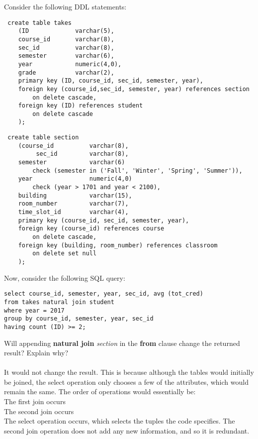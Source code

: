 \documentclass[a4 paper]{article}
\begin{document}
Consider the following DDL statements:
\begin{verbatim}
 create table takes
    (ID             varchar(5),
    course_id       varchar(8),
    sec_id          varchar(8),
    semester        varchar(6),
    year            numeric(4,0),
    grade           varchar(2),
    primary key (ID, course_id, sec_id, semester, year),
    foreign key (course_id,sec_id, semester, year) references section
        on delete cascade,
    foreign key (ID) references student
        on delete cascade
    );
\end{verbatim}
\begin{verbatim}
 create table section
    (course_id          varchar(8),
         sec_id         varchar(8),
    semester            varchar(6)
        check (semester in ('Fall', 'Winter', 'Spring', 'Summer')),
    year                numeric(4,0)
        check (year > 1701 and year < 2100),
    building            varchar(15),
    room_number         varchar(7),
    time_slot_id        varchar(4),
    primary key (course_id, sec_id, semester, year),
    foreign key (course_id) references course
        on delete cascade,
    foreign key (building, room_number) references classroom
        on delete set null
    );
\end{verbatim}

\noindent Now, consider the following SQL query:
\begin{verbatim}
select course_id, semester, year, sec_id, avg (tot_cred)
from takes natural join student
where year = 2017
group by course_id, semester, year, sec_id
having count (ID) >= 2;
\end{verbatim}

\noindent Will appending \textbf{natural join} \emph{section} in the \textbf{from} clause change the returned result? Explain why?\\\\
It would not change the result. This is because although the tables would initially be joined, the select operation only chooses a few of the attributes, which would remain the same. The order of operations would essentially be:\\
The first join occurs\\
The second join occurs\\
The select operation occurs, which selects the tuples the code specifies. The second join operation does not add any new information, and so it is redundant.
\end{document}
